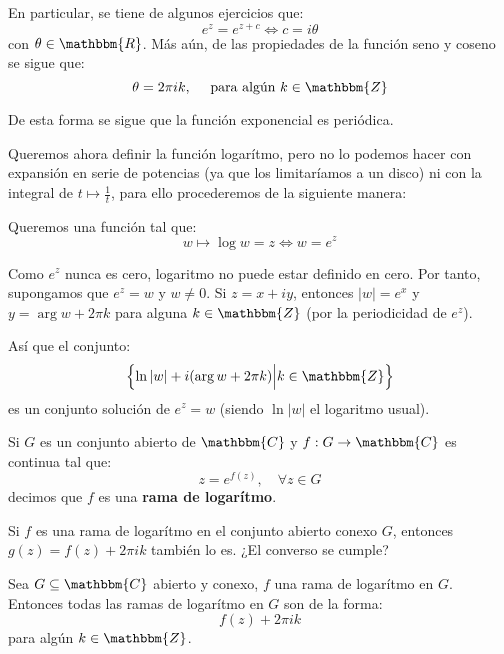 \documentclass[12pt]{report}
\newcounter{it}
\theoremstyle{largebreak}
\newcommand\abs[1]{\ensuremath{\left|#1\right|}}
\newcommand\cf[3]{\ensuremath{#1:#2\rightarrow#3}}
\newcommand{\bbm}[1]{\ensuremath{\mathbbm{#1}}}
\begin{document}
    En particular, se tiene de algunos ejercicios que:
    \begin{equation*}
        e^z=e^{ z+c}\iff c=i\theta
    \end{equation*}
    con $\theta\in\bbm{R}$. Más aún, de las propiedades de la función seno y coseno se sigue que:
    \begin{equation*}
        \theta=2\pi ik,\quad\textup{ para algún }k\in\bbm{Z}
    \end{equation*}

    De esta forma se sigue que la función exponencial es periódica.

    Queremos ahora definir la función logarítmo, pero no lo podemos hacer con expansión en serie de potencias (ya que los limitaríamos a un disco) ni con la integral de $t\mapsto\frac{1}{t}$, para ello procederemos de la siguiente manera:

    Queremos una función tal que:
    \begin{equation*}
        w\mapsto\log w=z\iff w=e^z
    \end{equation*}

    Como $e^z$ nunca es cero, logaritmo no puede estar definido en cero. Por tanto, supongamos que $e^z=w$ y $w\neq 0$. Si $z=x+iy$, entonces $\abs{w}=e^x$ y $y=\arg w+2\pi k$ para alguna $k\in\bbm{Z}$ (por la periodicidad de $e^z$).
    
    Así que el conjunto:
    \begin{equation*}
        \left\{\ln\abs{w}+i(\arg w+2\pi k)\Big|k\in\bbm{Z} \right\}
    \end{equation*}
    es un conjunto solución de $e^z=w$ (siendo $\ln\abs{w}$ el logaritmo usual).

    \begin{mydef}
        Si $G$ es un conjunto abierto de $\bbm{C}$ y $\cf{f}{G}{\bbm{C}}$ es continua tal que:
        \begin{equation*}
            z=e^{ f(z)},\quad\forall z\in G
        \end{equation*}
        decimos que $f$ es una \textbf{rama de logarítmo}.
    \end{mydef}

    \begin{obs}
        Si $f$ es una rama de logarítmo en el conjunto abierto conexo $G$, entonces $g(z)=f(z)+2\pi ik$ también lo es. ¿El converso se cumple?
    \end{obs}

    \begin{propo}
        Sea $G\subseteq\bbm{C}$ abierto y conexo, $f$ una rama de logarítmo en $G$. Entonces todas las ramas de logarítmo en $G$ son de la forma:
        \begin{equation*}
            f(z)+2\pi ik
        \end{equation*}
        para algún $k\in\bbm{Z}$.
    \end{propo}
\end{document}
